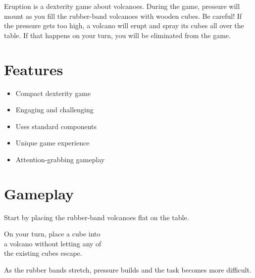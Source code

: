 \documentclass[a5paper, DIV=18, 12pt]{scrartcl}
\begin{document}
\vspace{-0.25ex}
\flushleft
Eruption is a dexterity game about volcanoes. During the game, pressure will mount as you fill the rubber-band volcanoes with wooden cubes. Be careful! If the pressure gets too high, a volcano will erupt and spray its cubes all over the table. If that happens on your turn, you will be eliminated from the game. 
\flushleft
\vspace{-0ex}
\begin{multicols}{2}
\section*{\textcolor{eruption_purple}{Features}}
%
%
\begin{itemize}[leftmargin=*, nosep]
\item Compact dexterity game
\vspace{0.9ex}
\item Engaging and challenging
\vspace{0.9ex}
\item Uses standard components
\vspace{0.9ex}
\item Unique game experience
\vspace{0.9ex}
\item Attention-grabbing gameplay
\end{itemize}

\section*{\textcolor{eruption_purple}{Gameplay}}
Start by placing the rubber-band volcanoes flat on the table.

\vspace{1.25ex}

On your turn, place a cube into\\a volcano without letting any of\\the existing cubes escape.

\vspace{1.25ex}

As the rubber bands stretch, pressure builds and the task becomes more difficult.


\end{multicols}
\end{document}

